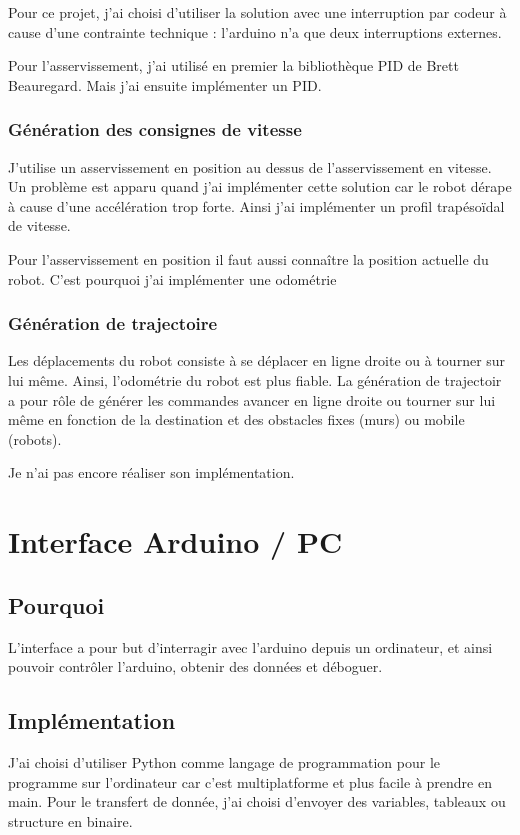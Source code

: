 \documentclass[11pt,a4paper]{report}
\begin{document}
        Pour ce projet, j'ai choisi d'utiliser la solution avec une interruption par codeur à cause d'une contrainte technique : l'arduino n'a que deux interruptions externes.

        Pour l'asservissement, j'ai utilisé en premier la bibliothèque PID de Brett Beauregard. Mais j'ai ensuite implémenter un PID.
      \subsubsection{Génération des consignes de vitesse}
        J'utilise un asservissement en position au dessus de l'asservissement en vitesse. Un problème est apparu quand j'ai implémenter cette solution car le robot dérape à cause d'une accélération trop forte. Ainsi j'ai implémenter un profil trapésoïdal de vitesse.

        Pour l'asservissement en position il faut aussi connaître la position actuelle du robot. C'est pourquoi j'ai implémenter une odométrie
      \subsubsection{Génération de trajectoire}
        Les déplacements du robot consiste à se déplacer en ligne droite ou à tourner sur lui même. Ainsi, l'odométrie du robot est plus fiable. La génération de trajectoir a pour rôle de générer les commandes avancer en ligne droite ou tourner sur lui même en fonction de la destination et des obstacles fixes (murs) ou mobile (robots).

        Je n'ai pas encore réaliser son implémentation.

  \section{Interface Arduino / PC}
    \subsection{Pourquoi}
      L'interface a pour but d'interragir avec l'arduino depuis un ordinateur, et ainsi pouvoir contr\^oler l'arduino, obtenir des données et déboguer.

    \subsection{Implémentation}
      J'ai choisi d'utiliser Python comme langage de programmation pour le programme sur l'ordinateur car c'est multiplatforme et plus facile à prendre en main.
      Pour le transfert de donnée, j'ai choisi d'envoyer des variables, tableaux ou structure en binaire.
\end{document}
